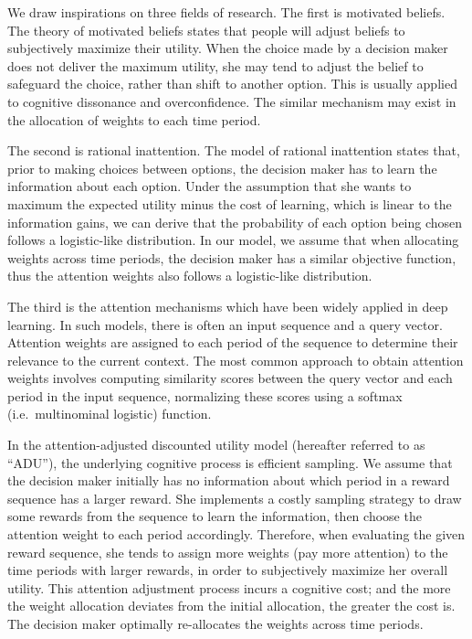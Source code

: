 \documentclass[
  12pt,
]{article}
\begin{document}
We draw inspirations on three fields of research. The first is motivated
beliefs. The theory of motivated beliefs states that people will adjust
beliefs to subjectively maximize their utility. When the choice made by
a decision maker does not deliver the maximum utility, she may tend to
adjust the belief to safeguard the choice, rather than shift to another
option. This is usually applied to cognitive dissonance and
overconfidence. The similar mechanism may exist in the allocation of
weights to each time period.

The second is rational inattention. The model of rational inattention
states that, prior to making choices between options, the decision maker
has to learn the information about each option. Under the assumption
that she wants to maximum the expected utility minus the cost of
learning, which is linear to the information gains, we can derive that
the probability of each option being chosen follows a logistic-like
distribution. In our model, we assume that when allocating weights
across time periods, the decision maker has a similar objective
function, thus the attention weights also follows a logistic-like
distribution.

The third is the attention mechanisms which have been widely applied in
deep learning. In such models, there is often an input sequence and a
query vector. Attention weights are assigned to each period of the
sequence to determine their relevance to the current context. The most
common approach to obtain attention weights involves computing
similarity scores between the query vector and each period in the input
sequence, normalizing these scores using a softmax (i.e.~multinominal
logistic) function.

In the attention-adjusted discounted utility model (hereafter referred
to as ``ADU''), the underlying cognitive process is efficient sampling.
We assume that the decision maker initially has no information about
which period in a reward sequence has a larger reward. She implements a
costly sampling strategy to draw some rewards from the sequence to learn
the information, then choose the attention weight to each period
accordingly. Therefore, when evaluating the given reward sequence, she
tends to assign more weights (pay more attention) to the time periods
with larger rewards, in order to subjectively maximize her overall
utility. This attention adjustment process incurs a cognitive cost; and
the more the weight allocation deviates from the initial allocation, the
greater the cost is. The decision maker optimally re-allocates the
weights across time periods.
\end{document}
